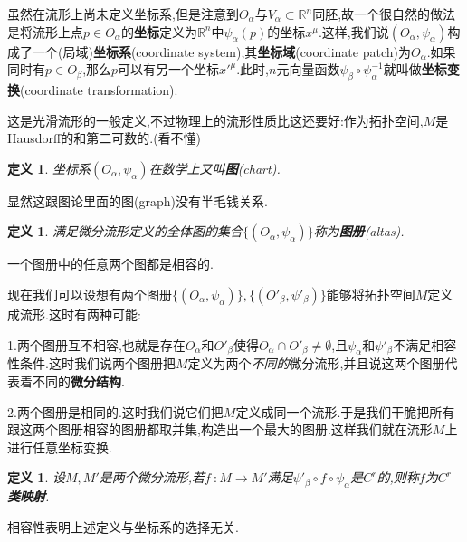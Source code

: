 \documentclass[UTF8]{article}
\begin{document}
	虽然在流形上尚未定义坐标系,但是注意到$O_{\alpha}$与$V_{\alpha} \subset \mathbb{R}^n$同胚,故一个很自然的做法是将流形上点$p \in O_{\alpha}$的\textbf{坐标}定义为$\mathbb{R}^n$中$\psi_{\alpha}(p)$的坐标$x^{\mu}$.这样,我们说$(O_{\alpha},\psi_{\alpha})$构成了一个(局域)\textbf{坐标系}(coordinate system),其\textbf{坐标域}(coordinate patch)为$O_{\alpha}$.如果同时有$p \in O_{\beta}$,那么$p$可以有另一个坐标$x'^{\mu}$.此时,$n$元向量函数$\psi_{\beta} \circ \psi_{\alpha}^{-1}$就叫做\textbf{坐标变换}(coordinate transformation).
	
	这是光滑流形的一般定义,不过物理上的流形性质比这还要好:作为拓扑空间,$M$是Hausdorff的和第二可数的.(看不懂)
	
	\newtheorem*{chart}{定义}
	
	\begin{chart}
		坐标系$(O_{\alpha},\psi_{\alpha})$在数学上又叫\textbf{图}(chart).
	\end{chart}
	
	显然这跟图论里面的图(graph)没有半毛钱关系.
	
	\newtheorem*{altas}{定义}
	
	\begin{altas}
		满足微分流形定义的全体图的集合$\{(O_{\alpha},\psi_{\alpha})\}$称为\textbf{图册}(altas).
	\end{altas}
	
	一个图册中的任意两个图都是相容的.
	
	现在我们可以设想有两个图册$\{(O_{\alpha},\psi_{\alpha})\},\{(O'_{\beta},\psi'_{\beta})\}$能够将拓扑空间$M$定义成流形.这时有两种可能:
	
	1.两个图册互不相容,也就是存在$O_{\alpha}$和$O'_{\beta}$使得$O_{\alpha} \cap O'_{\beta} \ne \emptyset$,且$\psi_{\alpha}$和$\psi'_{\beta}$不满足相容性条件.这时我们说两个图册把$M$定义为两个\textit{不同的}微分流形,并且说这两个图册代表着不同的\textbf{微分结构}.
	
	2.两个图册是相同的.这时我们说它们把$M$定义成同一个流形.于是我们干脆把所有跟这两个图册相容的图册都取并集,构造出一个最大的图册.这样我们就在流形$M$上进行任意坐标变换.
	
	\newtheorem*{CrMap}{定义}
	
	\begin{CrMap}
		设$M,M'$是两个微分流形,若$f~: M \to M'$满足$\psi'_{\beta} \circ f \circ \psi_{\alpha}$是$C^{r}$的,则称$f$为\textbf{$C^{r}$类映射}.
	\end{CrMap}
	
	相容性表明上述定义与坐标系的选择无关.
	
	\newtheorem*{diffeomorphicToEachOther}{定义}
	
\end{document}

